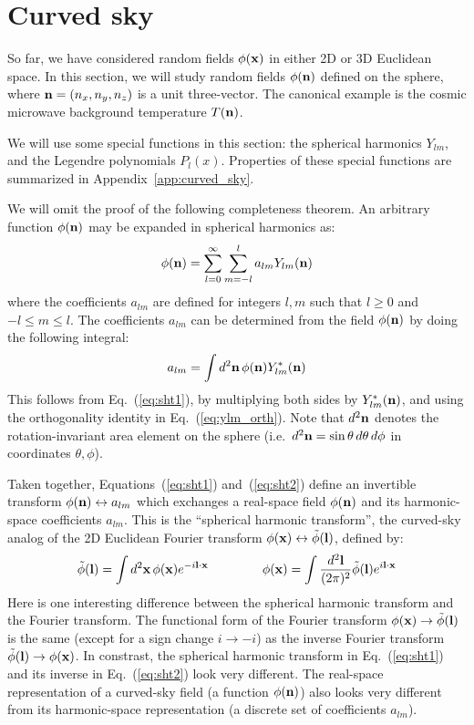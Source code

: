 \documentclass[aps,prd,superscriptaddress,groupedaddress,nofootinbib,nobibnotes]{revtex4}
\newcommand{\be}{\begin{equation}}
\newcommand{\ee}{\end{equation}}
\def\x{{\bf x}}
\def\l{{\bf l}}
\def\n{{\bf n}}
\def\tphi{{\tilde\phi}}
\begin{document}
\clearpage

\section{Curved sky}

So far, we have considered random fields $\phi(\x)$ in either 2D or 3D Euclidean space.
In this section, we will study random fields $\phi(\n)$ defined on the sphere, where $\n = (n_x, n_y, n_z)$
is a unit three-vector.
The canonical example is the cosmic microwave background temperature $T(\n)$.

We will use some special functions in this section: the spherical harmonics $Y_{lm}$,
and the Legendre polynomials $P_l(x)$.  Properties of these special functions are
summarized in Appendix~\ref{app:curved_sky}.

We will omit the proof of the following completeness theorem.
An arbitrary function $\phi(\n)$ may be expanded in spherical harmonics as:
\be
\phi(\n) = \sum_{l=0}^\infty \sum_{m=-l}^l a_{lm} Y_{lm}(\n)   \label{eq:sht1}
\ee
where the coefficients $a_{lm}$ are defined for integers $l,m$ such that $l \ge 0$ and $-l \le m \le l$.
The coefficients $a_{lm}$ can be determined from the field $\phi(\n)$ by doing the following integral:
\be
a_{lm} = \int d^2\n \, \phi(\n) Y_{lm}^*(\n)  \label{eq:sht2}
\ee
This follows from Eq.~(\ref{eq:sht1}), by multiplying both sides by $Y_{lm}^*(\n)$, and using the
orthogonality identity in Eq.~(\ref{eq:ylm_orth}).  Note that $d^2\n$ denotes the rotation-invariant
area element on the sphere (i.e.~$d^2\n = \sin\theta \, d\theta \, d\phi$ in coordinates $\theta,\phi$).

Taken together, Equations~(\ref{eq:sht1}) and~(\ref{eq:sht2}) define an invertible transform 
$\phi(\n) \leftrightarrow a_{lm}$ which exchanges a real-space field $\phi(\n)$ and its harmonic-space
coefficients $a_{lm}$.  This is the ``spherical harmonic transform'', the curved-sky analog of the
2D Euclidean Fourier transform $\phi(\x) \leftrightarrow \tphi(\l)$, defined by:
\be
\tphi(\l) = \int d^2\x \, \phi(\x) e^{-i\l\cdot\x}
  \hspace{1.5cm}
\phi(\x) = \int \frac{d^2\l}{(2\pi)^2} \tphi(\l) e^{i\l\cdot\x}
\ee
Here is one interesting difference between the spherical harmonic transform and the Fourier transform.
The functional form of the Fourier transform $\phi(\x) \rightarrow \tphi(\l)$ is the same (except for a 
sign change $i \rightarrow -i$) as the inverse Fourier transform $\tphi(\l) \rightarrow \phi(\x)$.
In constrast, the spherical harmonic transform in Eq.~(\ref{eq:sht1}) and its inverse in Eq.~(\ref{eq:sht2})
look very different.
The real-space representation of a curved-sky field (a function $\phi(\n)$) also looks very different from
its harmonic-space representation (a discrete set of coefficients $a_{lm}$).
\end{document}
